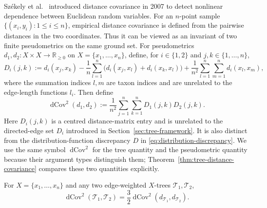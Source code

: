\documentclass[12pt]{article}
\DeclareMathOperator{\dCov}{dCov}
\begin{document}
Sz\'ekely et al.~\cite{SzekelyRizzoBakirov2007} introduced distance
covariance in 2007 to detect nonlinear dependence between Euclidean
random variables.  For an $n$-point sample
$\{(x_i,y_i):1\le i\le n\}$, empirical distance covariance is defined
from the pairwise distances in the two coordinates.  Thus it can be
viewed as an invariant of two finite pseudometrics on the same ground
set.  For pseudometrics $d_1,d_2:X\times X\to\mathbb R_{\ge0}$ on
$X=\{x_1,\ldots,x_n\}$, define, for $i\in\{1,2\}$ and
$j,k\in\{1,\ldots,n\}$,
\begin{equation}\label{eq:centred-distance-entries}
D_i(j,k):=d_i(x_j,x_k)
-\frac1n\sum_{l=1}^n\bigl(d_i(x_j,x_l)+d_i(x_k,x_l)\bigr)
+\frac1{n^2}\sum_{l=1}^n\sum_{m=1}^n d_i(x_l,x_m),
\end{equation}
where the summation indices $l,m$ are taxon indices and are unrelated to the
edge-length functions $l_i$.
Then define
\begin{equation}\label{eq:empirical-distance-covariance}
\dCov^2(d_1,d_2):=\frac1{n^2}\sum_{j=1}^n\sum_{k=1}^n
D_1(j,k)D_2(j,k).
\end{equation}
Here $D_i(j,k)$ is a centred distance-matrix entry and is unrelated to the
directed-edge set $D_i$ introduced in Section~\ref{sec:tree-framework}.
It is also distinct from the distribution-function discrepancy $D$ in
\eqref{eq:distribution-discrepancy}.  We use the same symbol
$\dCov^2$ for the tree quantity and the pseudometric quantity because their
argument types distinguish them; Theorem~\ref{thm:tree-distance-covariance}
compares these two quantities explicitly.

\begin{theorem}\label{thm:tree-distance-covariance}
For $X=\{x_1,\ldots,x_n\}$ and any two edge-weighted $X$-trees
$\mathcal T_1,\mathcal T_2$,
\begin{equation}\label{eq:display-077}
\dCov^2(\mathcal T_1,\mathcal T_2)
=\frac32\dCov^2(d_{\mathcal T_1},d_{\mathcal T_2}).
\end{equation}
\end{theorem}
\end{document}
